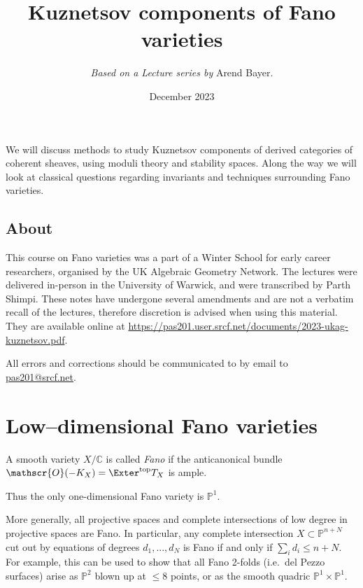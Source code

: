 \title{Kuznetsov components of Fano varieties}
\author{\textit{Based on a Lecture series by} Arend Bayer.}
\date{December 2023}
\maketitle

\newcommand{\deri}{\mathop{\mathbf{D}}}
\newcommand{\Jac}{\mathop{\mathcal{J\kern -0.5pt a\kern -0.5pt c\kern -1pt}}}
\newcommand{\IJac}{\mathop{I\mathcal{J\kern -0.5pt a\kern -0.5pt c\kern -1pt}}}
\newcommand{\Moduli}{\ensuremath{\mathscr{M}}}

We will discuss methods to study Kuznetsov components of derived categories of
coherent sheaves, using moduli theory and stability spaces. Along the way we
will look at classical questions regarding invariants and techniques surrounding
Fano varieties.

\subsection{About} This course on Fano varieties was a part of a Winter
School for early career researchers, organised by the UK Algebraic
Geometry Network. The lectures were delivered in-person in the University of
Warwick, and were transcribed by Parth Shimpi. These notes have undergone
several amendments and are not a verbatim recall of the lectures, therefore
discretion is advised when using this material. They are available online at
\url{https://pas201.user.srcf.net/documents/2023-ukag-kuznetsov.pdf}.

All errors and corrections should be communicated to by email to
\url{pas201@srcf.net}.


\section{Low--dimensional Fano varieties}
\begin{definition}
    A smooth variety \(X/\mathbb{C}\) is called \textit{Fano} if the
    anticanonical bundle \(\mathscr{O}(-K_X)=\Exter^\text{top}T_X\) is ample.
\end{definition}

Thus the only one-dimensional Fano variety is \(\mathbb{P}^1\).

More generally, all projective spaces and complete intersections of low degree
in projective spaces are Fano. In particular, any complete intersection
\(X\subset \mathbb{P}^{n+N}\) cut out by equations of degrees \(d_1,...,d_N\) is
Fano if and only if \(\sum_i d_i\leq n+N\). For example, this can be used to
show that all Fano 2-folds (i.e.\ del Pezzo surfaces) arise as \(\mathbb{P}^2\)
blown up at \(\leq 8\) points, or as the smooth quadric \(\mathbb{P}^1\times
\mathbb{P}^1\).

